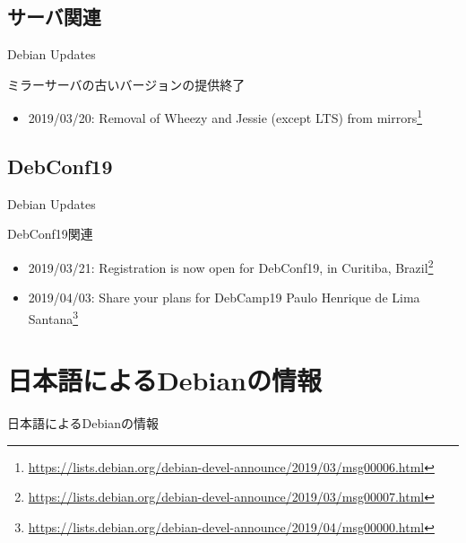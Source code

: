 \subsection{サーバ関連}

\begin{frame}{Debian Updates}%

ミラーサーバの古いバージョンの提供終了
  
\begin{itemize}
\item 2019/03/20: Removal of Wheezy and Jessie (except LTS) from mirrors\footnote{\url{https://lists.debian.org/debian-devel-announce/2019/03/msg00006.html}}
\end{itemize}

\end{frame}

\subsection{DebConf19}

\begin{frame}{Debian Updates}%

DebConf19関連
  
\begin{itemize}
\item 2019/03/21: Registration is now open for DebConf19, in Curitiba, Brazil\footnote{\url{https://lists.debian.org/debian-devel-announce/2019/03/msg00007.html}}
\item 2019/04/03: Share your plans for DebCamp19 Paulo Henrique de Lima Santana\footnote{\url{https://lists.debian.org/debian-devel-announce/2019/04/msg00000.html}}
\end{itemize}

\end{frame}




\section{日本語によるDebianの情報}

\begin{frame}\begin{center}\Huge{日本語によるDebianの情報}\end{center}\end{frame}

